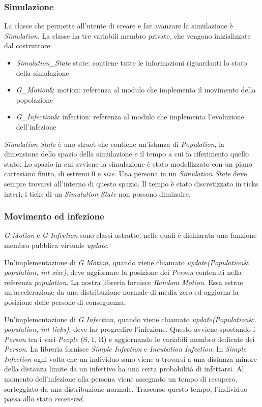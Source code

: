 \documentclass[a4paper,10pt,twocolumn]{article}
\begin{document}
\subsubsection*{Simulazione}
La classe che permette all’utente di creare e far avanzare la simulazione è \emph{Simulation}. La classe ha tre variabili membro private, che vengono inizializzate dal costruttore:
\begin{itemize}
    \item \emph{Simulation\_State} state: contiene tutte le informazioni riguardanti lo stato della simulazione
    \item \emph{G\_Motion}\& motion: referenza al modulo che implementa il movimento della popolazione
    \item \emph{G\_Infection}\& infection: referenza al modulo che implementa l’evoluzione dell’infezione
\end{itemize}

\emph{Simulation State} è uno struct che contiene un’istanza di \emph{Population}, la dimensione dello spazio della simulazione e il tempo a cui fa riferimento quello stato. Lo spazio in cui avviene la simulazione è stato modellizzato con un piano cartesiano finito, di estremi 0 e \emph{size}. Una persona in un \emph{Simulation State} deve sempre trovarsi all’interno di questo spazio. Il tempo è stato discretizzato in ticks interi; i ticks di un \emph{Simulation State} non possono diminuire.

\subsubsection*{Movimento ed infezione}
\emph{G Motion} e \emph{G Infection} sono classi astratte, nelle quali è dichiarata una funzione membro pubblica virtuale \emph{update}.

Un'implementazione di \emph{G Motion}, quando viene chiamato \emph{update(Population}\& \emph{population, int size)}, deve aggiornare la posizione dei \emph{Person} contenuti nella referenza \emph{population}. La nostra libreria fornisce \emph{Random Motion}. Essa estrae un'accelerazione da una distribuzione normale di media zero ed aggiorna la posizione delle persone di conseguenza.

Un'implementazione di \emph{G Infection}, quando viene chiamato \emph{update(Population}\& \emph{population, int ticks)}, deve far progredire l’infezione. Questo avviene spostando i \emph{Person} tra i vari \emph{People} (S, I, R) e aggiornando le variabili membro dedicate dei \emph{Person}. La libreria fornisce \emph{Simple Infection} e \emph{Incubation Infection}. In \emph{Simple Infection} ogni volta che un individuo sano viene a trovarsi a una distanza minore della distanza limite da un infettivo ha una certa probabilità di infettarsi. Al momento dell'infezione alla persona viene assegnato un tempo di recupero, sorteggiato da una distribuzione normale. Trascorso questo tempo, l'individuo passa allo stato \emph{recovered}.
\end{document}
